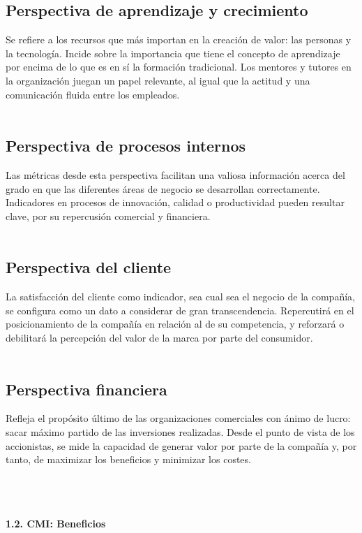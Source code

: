 \documentclass[twoside,twocolumn]{article}
\begin{document}
\begin{flushright}
\begin{itemize}
\subsection{Perspectiva de aprendizaje y crecimiento}
Se refiere a los recursos que más importan en la creación de valor: las personas y la tecnología. Incide sobre la importancia que tiene el concepto de aprendizaje por encima de lo que es en sí la formación tradicional. Los mentores y tutores en la organización juegan un papel relevante, al igual que la actitud y una comunicación fluida entre los empleados.
\textbf{}\\\textbf{}\\
\subsection{Perspectiva de procesos internos}
Las métricas desde esta perspectiva facilitan una valiosa información acerca del grado en que las diferentes áreas de negocio se desarrollan correctamente. Indicadores en procesos de innovación, calidad o productividad pueden resultar clave, por su repercusión comercial y financiera.
\textbf{}\\\textbf{}\\
\subsection{Perspectiva del cliente}
La satisfacción del cliente como indicador, sea cual sea el negocio  de la compañía, se configura como un dato a considerar de gran transcendencia. Repercutirá en el posicionamiento de la compañía en relación al de su competencia, y reforzará o debilitará la percepción del valor de la marca por parte del consumidor. 
\textbf{}\\\textbf{}\\
\subsection{Perspectiva financiera}
Refleja el propósito último de las organizaciones comerciales con ánimo de lucro: sacar máximo partido de las inversiones realizadas. Desde el punto de vista de los accionistas, se mide la capacidad de generar valor por parte de la compañía y, por tanto, de maximizar los beneficios y minimizar los costes.

\textbf{}\\\textbf{}\\\textbf{}\\
 \textbf{1.2.  CMI: Beneficios }\\


\end{itemize}
\end{flushright}
\end{document}
